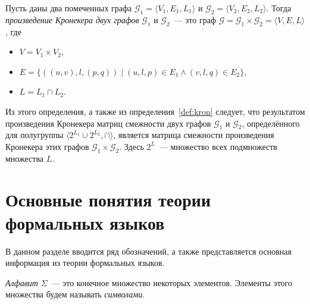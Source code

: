\begin{definition}
	Пусть даны два помеченных графа $\mathcal{G}_1=\langle V_1, E_1, L_1 \rangle$ и $\mathcal{G}_2=\langle V_2, E_2, L_2 \rangle$. Тогда \textit{произведение Кронекера двух графов} $\mathcal{G}_1$ и $\mathcal{G}_2$~--- это граф $\mathcal{G} = \mathcal{G}_1 \times \mathcal{G}_2 = \langle V, E, L \rangle$, где
	\begin{itemize}
	    \item $V = V_1 \times V_2$,
	    \item $E = \{((u, v), l, (p, q)) \mid (u, l, p) \in E_1 \wedge (v, l, q) \in E_2\}$,
	    \item $L = L_1 \cap L_2$.
	\end{itemize}
\end{definition}

Из этого определения, а также из определения~\ref{def:kron} следует, что результатом произведения Кронекера матриц смежности двух графов $\mathcal{G}_1$ и $\mathcal{G}_2$, определённого для полугруппы $\langle 2^{L_1} \cup 2^{L_2}, \cap \rangle$, является матрица смежности произведения Кронекера этих графов $\mathcal{G}_1 \times \mathcal{G}_2$. Здесь $2^L$~--- множество всех подмножеств множества $L$.

\section{Основные понятия теории формальных языков}\label{sec:ch1/sec3}
В данном разделе вводится ряд обозначений, а также представляется основная информация из теории формальных языков.

\begin{definition}[Алфавит]
	\textit{Алфавит} $\Sigma$~--- это конечное множество некоторых элементов.
	Элементы этого множества будем называть \textit{символами}.
\end{definition}


